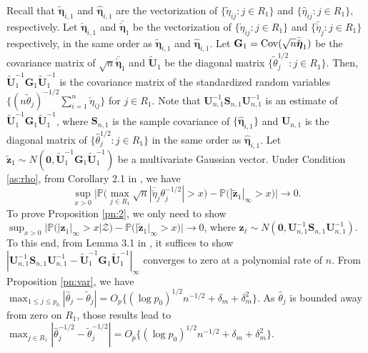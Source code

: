 \documentclass[12pt]{article}
\def\be{\begin{equation}}
\def\ee{\end{equation}}
\def\AZ{{ \mathrm{\scriptscriptstyle AZ} }}
\theoremstyle{definition}
\newcommand{\Cov}{\rm Cov}
\newcommand{\bG}{{\mathbf G}}
\newcommand{\bS}{{\mathbf S}}
\newcommand{\bU}{{\mathbf U}}
\newcommand{\bz}{{\mathbf z}}
\newcommand{\bfeta}  {\boldsymbol{\eta}}
\newcommand{\bzero}{{\mathbf 0}}
\begin{document}
Recall that $\tilde{\bfeta}_{i, 1}$ and $\hat{\bfeta}_{i, 1}$ are the vectorization of $\{\tilde{\eta}_{ij}: j \in R_{1}\}$ and $\{\hat{\eta}_{ij}: j \in R_{1}\}$, respectively. 
Let $\check{\bfeta}_{i, 1}$ and $\bar{\check{\bfeta}}_{1}$ be the vectorization of $\{\check{\eta}_{ij}: j \in R_{1}\}$ and $\{\bar{\check\eta}_{j} : j \in R_{1}\}$ respectively, in the same order as $\tilde{\bfeta}_{i, 1}$ and $\hat{\bfeta}_{i, 1}$.
Let $\bG_{1} = {\Cov}(\sqrt{n}\bar{\check{\bfeta}}_{1})$ be the covariance matrix of $\sqrt{n}\bar{\check{\bfeta}}_{1}$ and $\tilde{\bU}_{1}$ be the diagonal matrix $\{\tilde{\theta}_j^{1/2}: j \in R_1\}$. 
Then, $\tilde{\bU}_{1}^{-1}\bG_{1}\tilde{\bU}_{1}^{-1}$ is the covariance matrix of the standardized random variables $\{(n \tilde{\theta}_{j})^{-1/2}\sum_{i = 1}^{n}\check{\eta}_{ij}\}$ for $j \in R_1$.
Note that $\bU_{n, 1}^{-1} \bS_{n, 1} \bU_{n, 1}^{-1}$ is an estimate of $\tilde{\bU}_{1}^{-1}\bG_{1}\tilde{\bU}_{1}^{-1}$, where $\bS_{n, 1}$ is the sample covariance of $\{\hat{\bfeta}_{i, 1}\}$ and $\bU_{n, 1}$ is the diagonal matrix of $\{\hat{\theta}_{j}^{1/2}: j \in R_1\}$ in the same order as $\hat{\bfeta}_{i, 1}$.
Let $\tilde{\bz}_1 \sim N(\bzero, \tilde{\bU}_{1}^{-1}\bG_{1}\tilde{\bU}_{1}^{-1})$ be a multivariate Gaussian vector. 
Under Condition \ref{as:rho}, from Corollary 2.1 in \cite{chernozhukov2013gaussian}, we have
\be
\sup_{x>0}\big|\mathbb{P}\big(\max_{j \in R_1} \sqrt{n}|\bar{\check\eta}_{j} \theta_{j}^{-1/2}| > x\big) - \mathbb{P}\big(|\tilde{\bz}_1|_\infty > x\big)\big| \xrightarrow{} 0.
\label{eq:GA-1}\ee
To prove Proposition \ref{pn:2}, we only need to show $\sup_{x>0}\big|\mathbb{P}\big(|\bz_1|_{\infty} > x | \mathcal{Z} \big) - \mathbb{P}\big(|\tilde{\bz}_1|_\infty > x\big)\big| \xrightarrow{} 0$, where $\bz_{\ell} \sim N(\bzero, \bU_{n, 1}^{-1} \bS_{n, 1} \bU_{n, 1}^{-1})$. To this end, from Lemma 3.1 in \cite{chernozhukov2013gaussian}, it suffices to show $|\bU_{n, 1}^{-1} \bS_{n, 1} \bU_{n, 1}^{-1} - \tilde{\bU}_{1}^{-1}\bG_{1}\tilde{\bU}_{1}^{-1}|_{\infty}$ converges to zero at a polynomial rate of $n$.
From Proposition \ref{pn:var}, we have 
$\max_{1 \leq j \leq p_0} |\hat{\theta}_j - \tilde{\theta}_{j}| = O_{p}\{(\log p_0)^{1/2} n^{-1/2} + \delta_m + \delta_m^2\}$. 
As $\hat{\theta}_j$ is bounded away from zero on $R_1$, those results lead to
$\max_{j \in R_1} |\hat{\theta}_j^{-1/2} - \tilde{\theta}_{j}^{-1/2}| = O_{p}\{(\log p_0)^{1/2} n^{-1/2} + \delta_m + \delta_m^2\}$. 
\end{document}
